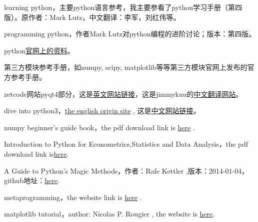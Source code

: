 \documentclass[12pt,oneside]{book}
\begin{document}
\begin{common-format}
\begin{thebibliography}{9}
 learning python，主要python语言参考，我主要参看了python学习手册（第四版）。原作者：Mark Lutz，中文翻译：李军，刘红伟等。

 programming python，作者Mark Lutz对python编程的进阶讨论；版本：第四版。

 python\href{https://docs.python.org/3/}{官网上的资料}。

 第三方模块参考手册，如numpy, scipy, matplotlib等等第三方模块官网上发布的官方参考手册。

 zetcode网站pyqt4部分，这是\href{http://zetcode.com/gui/pyqt4/}{英文网站链接}，这是jimmykuu的\href{http://blog.cx125.com/books/PyQt4_Tutorial/}{中文翻译网站}。

 dive into python3，\href{http://www.diveintopython3.net/index.html}{the english origin site} , 这是\href{http://sebug.net/paper/books/dive-into-python3/index.html}{中文网站链接}。

 numpy beginner's guide book，the pdf download link is \href{https://drive.google.com/open?id=0ByWxOeitx54PNXRIMUVybTlLZDQ&authuser=0}{here} . 

 Introduction to Python for Econometrics,Statistics and Data Analysis，the pdf download link is\href{https://drive.google.com/open?id=0ByWxOeitx54PTXN6RW5ydzQ4YXc&authuser=0}{here}.

 A Guide to Python's Magic Methods，作者：Rafe Kettler ,版本：2014-01-04，github地址：\href{https://github.com/RafeKettler/magicmethods}{here}.

 metaprogramming，the website link is \href{http://python-3-patterns-idioms-test.readthedocs.org/en/latest/Metaprogramming.html}{here} .

 matplotlib tutorial，author: Nicolas P. Rougier , the website is  \href{http://www.labri.fr/perso/nrougier/teaching/matplotlib/}{here}.  



\end{thebibliography}




\end{common-format}
\end{document}
